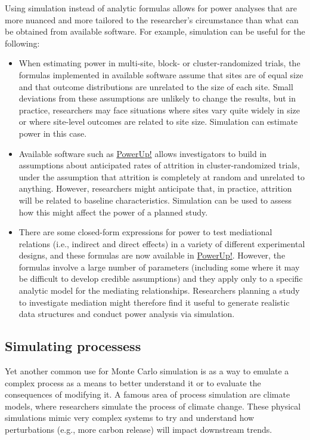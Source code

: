 \documentclass[
]{book}
\begin{document}
Using simulation instead of analytic formulas allows for power analyses that are more nuanced and more tailored to the researcher's circumstance than what can be obtained from available software.
For example, simulation can be useful for the following:

\begin{itemize}
\item
  When estimating power in multi-site, block- or cluster-randomized trials, the formulas implemented in available software assume that sites are of equal size and that outcome distributions are unrelated to the size of each site.
  Small deviations from these assumptions are unlikely to change the results, but in practice, researchers may face situations where sites vary quite widely in size or where site-level outcomes are related to site size.
  Simulation can estimate power in this case.
\item
  Available software such as \href{https://www.causalevaluation.org/power-analysis.html}{PowerUp!} allows investigators to build in assumptions about anticipated rates of attrition in cluster-randomized trials, under the assumption that attrition is completely at random and unrelated to anything.
  However, researchers might anticipate that, in practice, attrition will be related to baseline characteristics.
  Simulation can be used to assess how this might affect the power of a planned study.
\item
  There are some closed-form expressions for power to test mediational relations (i.e., indirect and direct effects) in a variety of different experimental designs, and these formulas are now available in \href{https://www.causalevaluation.org/power-analysis.html}{PowerUp!}.
  However, the formulas involve a large number of parameters (including some where it may be difficult to develop credible assumptions) and they apply only to a specific analytic model for the mediating relationships.
  Researchers planning a study to investigate mediation might therefore find it useful to generate realistic data structures and conduct power analysis via simulation.
\end{itemize}

\subsection{Simulating processess}\label{simulating-processess}

Yet another common use for Monte Carlo simulation is as a way to emulate a complex process as a means to better understand it or to evaluate the consequences of modifying it.
A famous area of process simulation are climate models, where researchers simulate the process of climate change.
These physical simulations mimic very complex systems to try and understand how perturbations (e.g., more carbon release) will impact downstream trends.
\end{document}
